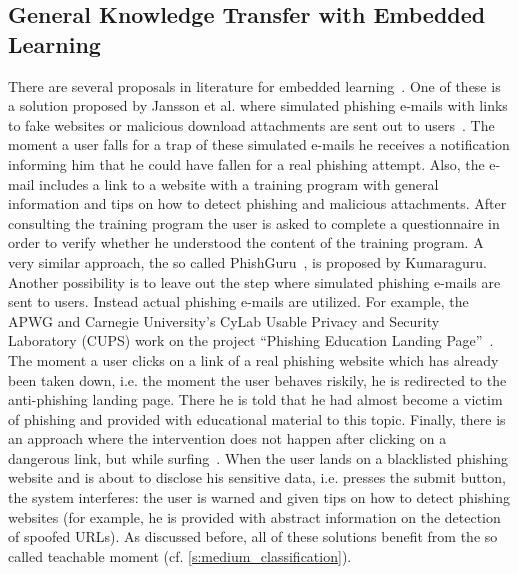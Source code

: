 \subsection{General Knowledge Transfer with Embedded Learning}

There are several proposals in literature for embedded learning~\cite{jannson2011simulating, kumaraguru2009phishguru,alnajim2009antiphishing}. 
One of these is a solution proposed by Jansson et al. where simulated phishing e-mails with links to fake websites or malicious download attachments are sent out to users~\cite{jannson2011simulating}. 
The moment a user falls for a trap of these simulated e-mails he receives a notification informing him that he could have fallen for a real phishing attempt. 
Also, the e-mail includes a link to a website with a training program with general information and tips on how to detect phishing and malicious attachments. 
After consulting the training program the user is asked to complete a questionnaire in order to verify whether he understood the content of the training program. 
A very similar approach, the so called PhishGuru~\cite{kumaraguru2009phishguru}, is proposed by Kumaraguru. 
Another possibility is to leave out the step where simulated phishing e-mails are sent to users. 
Instead actual phishing e-mails are utilized. 
For example, the APWG and Carnegie University's CyLab Usable Privacy and Security Laboratory (CUPS) work on the project ``Phishing Education Landing Page''~\cite{apwg2009landingpage}. 
The moment a user clicks on a link of a real phishing website which has already been taken down, i.e. the moment the user behaves riskily, he is redirected to the anti-phishing landing page.
There he is told that he had almost become a victim of phishing and provided with educational material to this topic. 
Finally, there is an approach where the intervention does not happen after clicking on a dangerous link, but while surfing~\cite{alnajim2009antiphishing}. 
When the user lands on a blacklisted phishing website and is about to disclose his sensitive data, i.e. presses the submit button, the system interferes: 
the user is warned and given tips on how to detect phishing websites (for example, he is provided with abstract information on the detection of spoofed URLs). 
As discussed before, all of these solutions benefit from the so called teachable moment (cf. \autoref{s:medium_classification}).
